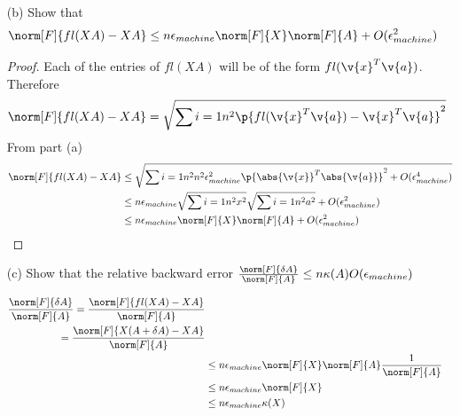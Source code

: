 \documentclass[11pt]{article}
\begin{document}
\begin{enumerate}
\begin{enumerate}
            \item[(b)]
                Show that
                \[
                    \norm[F]{fl(XA) - XA} \le n \epsilon_{machine} \norm[F]{X} \norm[F]{A} + O(\epsilon^2_{machine})
                \]

                \begin{proof}
                    Each of the entries of $fl(XA)$ will be of the form $fl(\v{x}^T \v{a})$.
                    Therefore 
                    \[
                        \norm[F]{fl(XA) - XA} = \sqrt{\sum{i = 1}{n^2}{\p{fl(\v{x}^T \v{a}) - \v{x}^T\v{a}}^2}}
                    \]
                    From part (a)
                    \begin{align*}
                        \norm[F]{fl(XA) - XA} &\le \sqrt{\sum{i = 1}{n^2}{n^2 \epsilon^2_{machine} \p{\abs{\v{x}}^T \abs{\v{a}}}^2 + O(\epsilon_{machine}^4)}} \\
                        &\le n \epsilon_{machine} \sqrt{\sum{i = 1}{n^2}{x^2}} \sqrt{\sum{i = 1}{n^2}{a^2}} + O(\epsilon_{machine}^2) \\
                        &\le n \epsilon_{machine} \norm[F]{X} \norm[F]{A} + O(\epsilon_{machine}^2) \\
                    \end{align*}
                \end{proof}

            \item[(c)]
                Show that the relative backward error
                $\frac{\norm[F]{\delta A}}{\norm[F]{A}} \le n \kappa(A)O(\epsilon_{machine})$

                \begin{align*}
                    \frac{\norm[F]{\delta A}}{\norm[F]{A}} = \frac{\norm[F]{fl(XA) - XA}}{\norm[F]{A}} \\
                    = \frac{\norm[F]{X(A + \delta A) - XA}}{\norm[F]{A}} \\
                    &\le n \epsilon_{machine} \norm[F]{X} \norm[F]{A} \frac{1}{\norm[F]{A}} \\
                    &\le n \epsilon_{machine} \norm[F]{X} \\
                    &\le n \epsilon_{machine} \kappa(X) \\
                \end{align*}
        \end{enumerate}


\end{enumerate}
\end{document}
